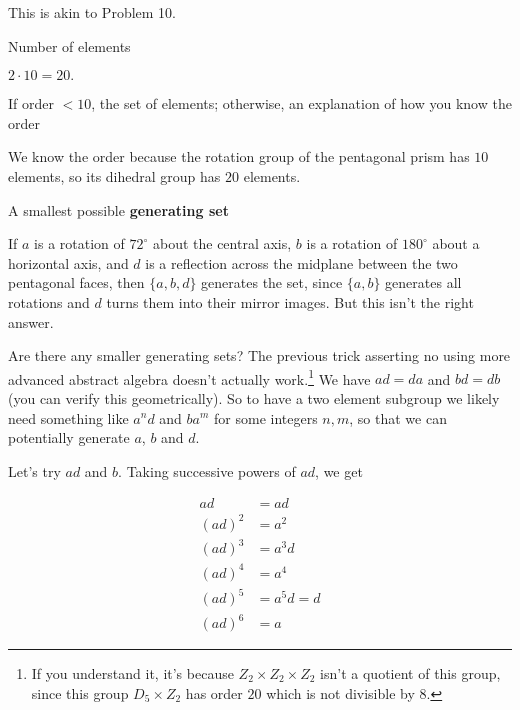 \documentclass[../key.tex]{subfiles}
\begin{document}
\noindent This is akin to Problem 10.

\begin{inner_problem}[start=1]
\item Number of elements
\end{inner_problem}

\noindent$2\cdot 10=20.$

\begin{inner_problem}
\item If order $< 10$, the set of elements; otherwise, an explanation of how you know the order
\end{inner_problem}

\noindent We know the order because the rotation group of the pentagonal prism has $10$ elements, so its dihedral group has $20$ elements.

\begin{inner_problem}
\item A smallest possible \textbf{generating set}
\end{inner_problem}

\noindent If $a$ is a rotation of $72^\circ$ about the central axis, $b$ is a rotation of $180^\circ$ about a horizontal axis, and $d$ is a reflection across the midplane between the two pentagonal faces, then $\{a,b,d\}$ generates the set, since $\{a,b\}$ generates all rotations and $d$ turns them into their mirror images. But this isn't the right answer.

Are there any smaller generating sets? The previous trick asserting no using more advanced abstract algebra doesn't actually work.\footnote{If you understand it, it's because $Z_2\times Z_2\times Z_2$ isn't a quotient of this group, since this group $D_5 \times Z_2$ has order $20$ which is not divisible by $8$.} We have $ad=da$ and $bd=db$ (you can verify this geometrically). So to have a two element subgroup we likely need something like $a^nd$ and $ba^m$ for some integers $n,m$, so that we can potentially generate $a$, $b$ and $d$.

Let's try $ad$ and $b$. Taking successive powers of $ad$, we get

\begin{align*}
ad &= ad \\
(ad)^2 &= a^2 \\
(ad)^3 &= a^3d \\
(ad)^4 &= a^4 \\
(ad)^5 &= a^5d = d \\
(ad)^6 &= a
\end{align*}
\end{document}
